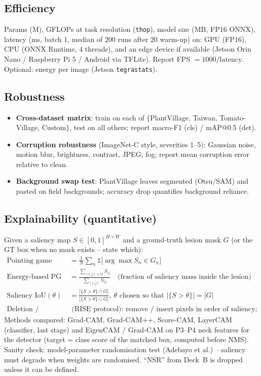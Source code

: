 \subsection{Efficiency}
Params (M), GFLOPs at task resolution (\texttt{thop}), model size (MB, FP16 ONNX), latency (ms, batch 1, median of 200 runs after 20 warm-up) on: GPU (FP16), CPU (ONNX Runtime, 4 threads), and an edge device if available (Jetson Orin Nano / Raspberry Pi 5 / Android via TFLite). Report FPS $=1000/\text{latency}$. Optional: energy per image (Jetson \texttt{tegrastats}).

\subsection{Robustness}
\begin{itemize}
  \item \textbf{Cross-dataset matrix}: train on each of $\{$PlantVillage, Taiwan, Tomato-Village, Custom$\}$, test on all others; report macro-F1 (cls) / mAP@0.5 (det).
  \item \textbf{Corruption robustness} (ImageNet-C style, severities 1--5): Gaussian noise, motion blur, brightness, contrast, JPEG, fog; report mean corruption error relative to clean.
  \item \textbf{Background swap test}: PlantVillage leaves segmented (Otsu/SAM) and pasted on field backgrounds; accuracy drop quantifies background reliance.
\end{itemize}

\subsection{Explainability (quantitative)}
Given a saliency map $S\in[0,1]^{H\times W}$ and a ground-truth lesion mask $G$ (or the GT box when no mask exists -- state which):
\begin{align}
\text{Pointing game} &= \tfrac{1}{N}\textstyle\sum_n \mathbb{1}\big[\arg\max S_n \in G_n\big] \\
\text{Energy-based PG} &= \frac{\sum_{(i,j)\in G} S_{ij}}{\sum_{(i,j)} S_{ij}} \quad\text{(fraction of saliency mass inside the lesion)}\\
\text{Saliency IoU}(\theta) &= \tfrac{|\{S>\theta\}\cap G|}{|\{S>\theta\}\cup G|},\ \theta \text{ chosen so that } |\{S>\theta\}| = |G| \\
\text{Deletion / Insertion AUC} & \text{ (RISE protocol): remove / insert pixels in order of saliency; AUC of score-vs-fraction curve}
\end{align}
Methods compared: Grad-CAM, Grad-CAM++, Score-CAM, LayerCAM (classifier, last stage) and EigenCAM / Grad-CAM on P3--P4 neck features for the detector (target = class score of the matched box, computed before NMS). Sanity check: model-parameter randomisation test (Adebayo et al.) -- saliency must degrade when weights are randomised. ``NSR'' from Deck~B is dropped unless it can be defined.


